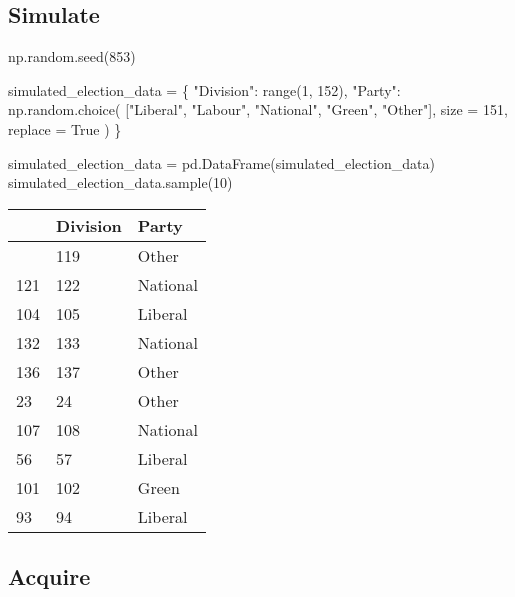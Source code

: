 \documentclass[
  letterpaper,
  DIV=11,
  numbers=noendperiod]{scrreprt}
\newenvironment{Shaded}{\begin{snugshade}}{\end{snugshade}}
\newcommand{\BuiltInTok}[1]{\textcolor[rgb]{0.00,0.23,0.31}{#1}}
\newcommand{\DecValTok}[1]{\textcolor[rgb]{0.68,0.00,0.00}{#1}}
\newcommand{\NormalTok}[1]{\textcolor[rgb]{0.00,0.23,0.31}{#1}}
\newcommand{\OperatorTok}[1]{\textcolor[rgb]{0.37,0.37,0.37}{#1}}
\newcommand{\StringTok}[1]{\textcolor[rgb]{0.13,0.47,0.30}{#1}}
\newcommand{\VariableTok}[1]{\textcolor[rgb]{0.07,0.07,0.07}{#1}}
\begin{document}
\hypertarget{simulate}{%
\subsection{Simulate}\label{simulate}}

\begin{Shaded}
\begin{Highlighting}[]
\NormalTok{np.random.seed(}\DecValTok{853}\NormalTok{)}

\NormalTok{simulated\_election\_data }\OperatorTok{=}\NormalTok{ \{}
    \StringTok{"Division"}\NormalTok{: }\BuiltInTok{range}\NormalTok{(}\DecValTok{1}\NormalTok{, }\DecValTok{152}\NormalTok{),}
    \StringTok{"Party"}\NormalTok{: np.random.choice(}
\NormalTok{        [}\StringTok{"Liberal"}\NormalTok{, }\StringTok{"Labour"}\NormalTok{, }\StringTok{"National"}\NormalTok{, }\StringTok{"Green"}\NormalTok{, }\StringTok{"Other"}\NormalTok{],}
\NormalTok{        size }\OperatorTok{=} \DecValTok{151}\NormalTok{,}
\NormalTok{        replace }\OperatorTok{=} \VariableTok{True}
\NormalTok{    )}
\NormalTok{\}}

\NormalTok{simulated\_election\_data }\OperatorTok{=}\NormalTok{ pd.DataFrame(simulated\_election\_data)}
\NormalTok{simulated\_election\_data.sample(}\DecValTok{10}\NormalTok{)}
\end{Highlighting}
\end{Shaded}

\begin{longtable}[]{@{}lll@{}}
\toprule\noalign{}
& Division & Party \\
\midrule\noalign{}
\endhead
\bottomrule\noalign{}
\endlastfoot
118 & 119 & Other \\
121 & 122 & National \\
104 & 105 & Liberal \\
132 & 133 & National \\
136 & 137 & Other \\
23 & 24 & Other \\
107 & 108 & National \\
56 & 57 & Liberal \\
101 & 102 & Green \\
93 & 94 & Liberal \\
\end{longtable}

\hypertarget{acquire}{%
\subsection{Acquire}\label{acquire}}
\end{document}

